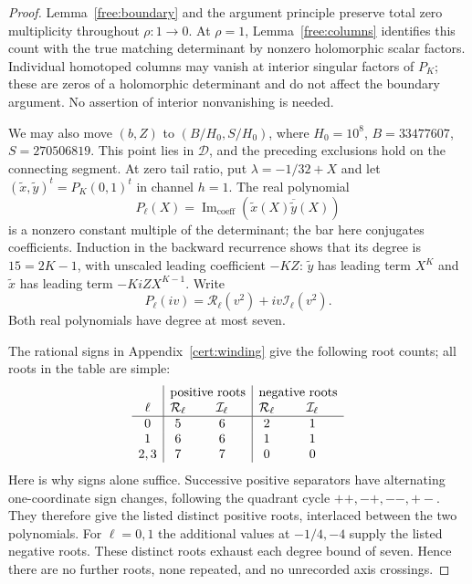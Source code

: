 \documentclass[11pt]{article}
\numberwithin{equation}{section}
\theoremstyle{definition}
\theoremstyle{remark}
\begin{document}
\begin{proof}
Lemma~\ref{free:boundary} and the argument principle preserve total
zero multiplicity throughout $\rho:1\to0$.  At $\rho=1$,
Lemma~\ref{free:columns} identifies this count with the true matching
determinant by nonzero holomorphic scalar factors.  Individual
homotoped columns may vanish at interior singular factors of $P_K$;
these are zeros of a holomorphic determinant and do not affect the
boundary argument.  No assertion of interior nonvanishing is needed.

We may also move $(b,Z)$ to $(B/H_0,S/H_0)$, where
$H_0=10^8$, $B=33477607$, $S=270506819$.  This point lies in
$\mathcal D$, and the preceding exclusions hold on the connecting
segment.  At zero tail ratio, put $\lambda=-1/32+X$ and let
$(\widetilde x,\widetilde y)^t=P_K(0,1)^t$ in channel $h=1$.
The real polynomial
\[
 P_\ell(X)=\operatorname{Im}_{\mathrm{coeff}}
 (\widetilde x(X)\overline{\widetilde y}(X))
\]
is a nonzero constant multiple of the determinant; the bar here
conjugates coefficients.  Induction in the backward recurrence shows
that its degree is $15=2K-1$, with unscaled leading coefficient $-KZ$:
$\widetilde y$ has leading term $X^K$ and $\widetilde x$ has leading
term $-KiZ X^{K-1}$.  Write
\begin{equation}\label{free:axis-polynomials}
 P_\ell(iv)=\mathcal R_\ell(v^2)+iv\mathcal I_\ell(v^2).
\end{equation}
Both real polynomials have degree at most seven.

The rational signs in Appendix~\ref{cert:winding} give the following
root counts; all roots in the table are simple:
\[
\begin{array}{c|cc|cc}
 &\multicolumn{2}{c|}{\text{positive roots}}&
   \multicolumn{2}{c}{\text{negative roots}}\\
 \ell&\mathcal R_\ell&\mathcal I_\ell&\mathcal R_\ell&\mathcal I_\ell\\\hline
 0&5&6&2&1\\
 1&6&6&1&1\\
 2,3&7&7&0&0
\end{array}
\]
Here is why signs alone suffice.  Successive positive separators have
alternating one-coordinate sign changes, following the quadrant cycle
$++,-+,--,+-$.  They therefore give the listed distinct positive
roots, interlaced between the two polynomials.  For $\ell=0,1$ the
additional values at $-1/4,-4$ supply the listed negative roots.
These distinct roots exhaust each degree bound of seven.  Hence there
are no further roots, none repeated, and no unrecorded axis crossings.


\end{proof}
\end{document}
